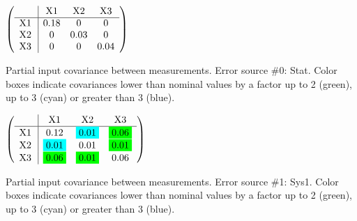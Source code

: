 \begin{table}[H]
\scriptsize
\begin{center}
\renewcommand{\arraystretch}{1.1}
\begin{math}\left(\begin{array}{c|ccc}
 & \mathrm{X1} & 
\mathrm{X2} & 
\mathrm{X3} \\
\hline
\mathrm{X1} \hspace*{2pt} &       0.18 &  0 &  0 \\
\mathrm{X2} \hspace*{2pt} &  0 &       0.03 &  0 \\
\mathrm{X3} \hspace*{2pt} &  0 &  0 &       0.04 \\
\end{array}\right)\end{math}
\caption{Partial input covariance between measurements. Error source \#0: Stat. Color boxes indicate covariances lower than nominal values by a factor up to 2 (green), up to 3 (cyan) or greater than 3 (blue).}
\renewcommand{\arraystretch}{1}
\end{center}
\end{table}
\begin{table}[H]
\scriptsize
\begin{center}
\renewcommand{\arraystretch}{1.1}
\begin{math}\left(\begin{array}{c|ccc}
 & \mathrm{X1} & 
\mathrm{X2} & 
\mathrm{X3} \\
\hline
\mathrm{X1} \hspace*{2pt} &       0.12 &  \colorbox{Cyan1}{$      0.01$} &  \colorbox{Green1}{$      0.06$} \\
\mathrm{X2} \hspace*{2pt} &  \colorbox{Cyan1}{$      0.01$} &       0.01 &  \colorbox{Green1}{$      0.01$} \\
\mathrm{X3} \hspace*{2pt} &  \colorbox{Green1}{$      0.06$} &  \colorbox{Green1}{$      0.01$} &       0.06 \\
\end{array}\right)\end{math}
\caption{Partial input covariance between measurements. Error source \#1: Sys1. Color boxes indicate covariances lower than nominal values by a factor up to 2 (green), up to 3 (cyan) or greater than 3 (blue).}
\renewcommand{\arraystretch}{1}
\end{center}
\end{table}
